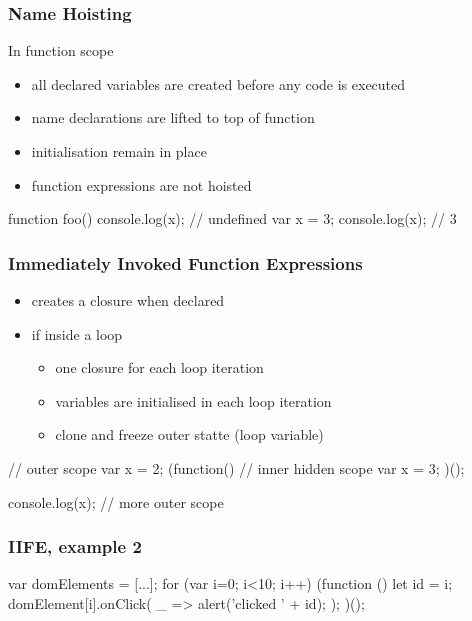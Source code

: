 \begin{frame}[fragile] \frametitle{Name Hoisting}
In function scope
\begin{itemize}
  \item all declared variables are created before any code is executed
  \item name declarations are lifted to top of function
  \item initialisation remain in place
  \item function expressions are not hoisted
\end{itemize}

\begin{CodeBox}{}
function foo() {
  console.log(x);  // undefined
  var x = 3;
  console.log(x);  // 3
}
\end{CodeBox}
\end{frame}

\begin{frame}[fragile] \frametitle{Immediately Invoked Function Expressions}
\begin{itemize}
  \item creates a closure when declared
  \item if inside a loop
  \begin{itemize}
    \item one closure for each loop iteration
    \item variables are initialised in each loop iteration
    \item clone and freeze outer statte (loop variable)
  \end{itemize}
\end{itemize}

\begin{CodeBox}{}
// outer scope
var x = 2;
(function() {
  // inner hidden scope
  var x = 3;
})();

console.log(x);
// more outer scope
\end{CodeBox}
\end{frame}

\begin{frame}[fragile] \frametitle{IIFE, example 2}

\begin{CodeBox}{}
var domElements = [...];
for (var i=0; i<10; i++) {
  (function () {
    let id = i;
    domElement[i].onClick(
      _ => { alert('clicked ' + id); }
    );
  })();  
}
\end{CodeBox}
\end{frame}


